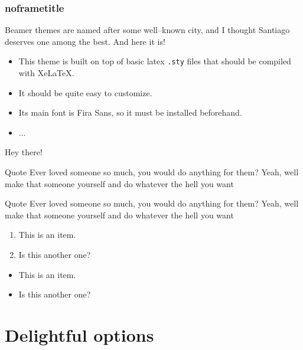 \documentclass[aspectratio=169]{beamer}
\begin{document}
\begin{frame}
\frametitle{noframetitle}

Beamer themes are named after some well--known city, and I thought Santiago
deserves one among the best. And here it is!

\begin{itemize}
  \item This theme is built on top of basic latex \texttt{.sty} files that should be compiled with XeLaTeX.
  \item It should be quite easy to customize.
  \item Its main font is Fira Sans, so it must be installed beforehand.
  \item ...
\end{itemize}




Hey there!
\begin{block}{Quote}
Ever loved someone so much, you would do anything for them? Yeah, well make that someone yourself and do whatever the hell you want
\end{block}
\begin{block}{Quote}
Ever loved someone so much, you would do anything for them? Yeah, well make that someone yourself and do whatever the hell you want
\end{block}

\begin{enumerate}
  \item This is an item.
  \item Is this another one?
\end{enumerate}

\begin{itemize}
  \item This is an item.
  \item Is this another one?
\end{itemize}

\end{frame}





\section{Delightful options}
\end{document}
